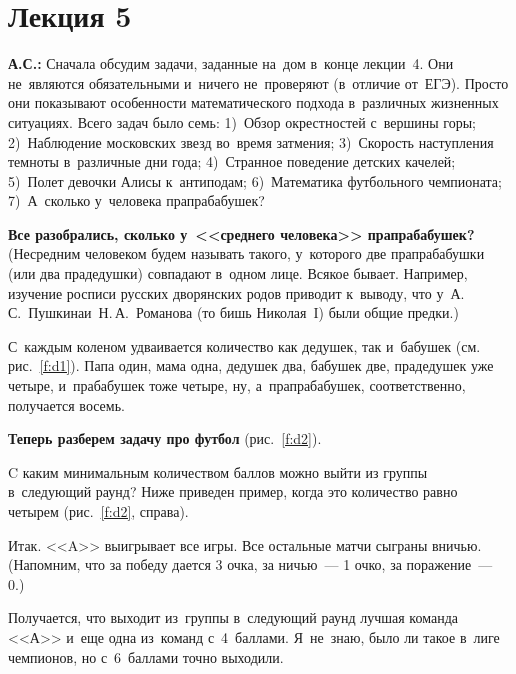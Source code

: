 \section{Лекция 5}
\label{1.5}

\textbf{А.С.:} Сначала обсудим задачи, заданные на~дом в~конце лекции~4. Они не~являются обязательными и~ничего
не~проверяют (в~отличие от~ЕГЭ). Просто они показывают особенности математического подхода
в~различных жизненных ситуациях. Всего задач было семь: 1)~Обзор окрестностей с~вершины горы;
2)~Наблюдение московских звезд во~время затмения; 3)~Скорость наступления темноты в~различные дни
года; 4)~Странное поведение детских качелей; 5)~Полет девочки Алисы к~антиподам; 6)~Математика
футбольного чемпионата; 7)~А~сколько у~человека прапрабабушек?

\textbf{Все разобрались, сколько у~<<среднего человека>> пра\-пра\-ба\-бу\-шек?} (Несредним
человеком будем называть такого, у~которого две прапрабабушки (или два прадедушки) совпадают в~одном лице. Всякое бывает.
 Например, изучение росписи русских дворянских родов приводит к~выводу, что
у~А.\,С.~Пушкина\linebreak и~Н.\,А.~Романова (то бишь Николая~I) были общие предки.)


С~каждым коленом удваивается количество как дедушек, так и~бабушек (см. рис.~\ref{f:d1}). Папа один, мама одна, дедушек
два, бабушек две, прадедушек уже четыре, и~прабабушек тоже четыре, ну, а~прапрабабушек,
соответственно, получается восемь.

\textbf{Теперь разберем задачу про футбол} (рис.~\ref{f:d2}).

\pagebreak

C каким минимальным количеством баллов можно выйти из группы в~следующий раунд? Ниже приведен
пример, когда это количество равно четырем (рис.~\ref{f:d2}, справа).


Итак. <<A>> выигрывает все игры. Все остальные матчи сыграны вничью. (Напомним, что за победу дается 3 очка, за ничью~--- 1 очко, за поражение~--- 0.)

Получается, что выходит из~группы в~следующий раунд лучшая команда <<А>> и~еще одна из~команд
с~4~баллами. Я~не~знаю, было ли такое в~лиге чемпионов, но с~6~баллами точно выходили.

